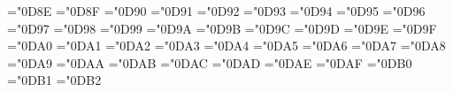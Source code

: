 \let\mNotLeftTriangleBar=\NotLeftTriangleBar 
\mathchardef\NotRightTriangleBar ="0D8E
\let\mNotRightTriangleBar=\NotRightTriangleBar 
\mathchardef\NotLeftTriangle ="0D8F
\let\mNotLeftTriangle=\NotLeftTriangle 
\mathchardef\NotLeftTriangleEqual ="0D90
\let\mNotLeftTriangleEqual=\NotLeftTriangleEqual 
\mathchardef\NotRightTriangle ="0D91
\let\mNotRightTriangle=\NotRightTriangle 
\mathchardef\NotRightTriangleEqual ="0D92
\let\mNotRightTriangleEqual=\NotRightTriangleEqual 
\mathchardef\neq ="0D93
\let\mNotEqual=\neq 
\mathchardef\nless ="0D94
\let\mNotLess=\nless 
\mathchardef\ngtr ="0D95
\let\mNotGreater=\ngtr 
\mathchardef\leq ="0D96
\let\mLessEqual=\leq 
\mathchardef\ll ="0D97
\let\mLessLess=\ll 
\mathchardef\gg ="0D98
\let\mGreaterGreater=\gg 
\mathchardef\nleq ="0D99
\let\mNotLessEqual=\nleq 
\mathchardef\geq ="0D9A
\let\mGreaterEqual=\geq 
\mathchardef\ngeq ="0D9B
\let\mNotGreaterEqual=\ngeq 
\mathchardef\LessSlantEqual ="0D9C
\let\mLessSlantEqual=\LessSlantEqual 
\mathchardef\LessFullEqual ="0D9D
\let\mLessFullEqual=\LessFullEqual 
\mathchardef\NotLessLess ="0D9E
\let\mNotLessLess=\NotLessLess 
\mathchardef\NotNestedLessLess ="0D9F
\let\mNotNestedLessLess=\NotNestedLessLess 
\mathchardef\NotLessSlantEqual ="0DA0
\let\mNotLessSlantEqual=\NotLessSlantEqual 
\mathchardef\NotLessFullEqual ="0DA1
\let\mNotLessFullEqual=\NotLessFullEqual 
\mathchardef\NestedLessLess ="0DA2
\let\mNestedLessLess=\NestedLessLess 
\mathchardef\NestedGreaterGreater ="0DA3
\let\mNestedGreaterGreater=\NestedGreaterGreater 
\mathchardef\GreaterSlantEqual ="0DA4
\let\mGreaterSlantEqual=\GreaterSlantEqual 
\mathchardef\GreaterFullEqual ="0DA5
\let\mGreaterFullEqual=\GreaterFullEqual 
\mathchardef\NotGreaterGreater ="0DA6
\let\mNotGreaterGreater=\NotGreaterGreater 
\mathchardef\NotNestedGreaterGreater ="0DA7
\let\mNotNestedGreaterGreater=\NotNestedGreaterGreater 
\mathchardef\NotGreaterSlantEqual ="0DA8
\let\mNotGreaterSlantEqual=\NotGreaterSlantEqual 
\mathchardef\NotGreaterFullEqual ="0DA9
\let\mNotGreaterFullEqual=\NotGreaterFullEqual 
\mathchardef\LessGreater ="0DAA
\let\mLessGreater=\LessGreater 
\mathchardef\GreaterLess ="0DAB
\let\mGreaterLess=\GreaterLess 
\mathchardef\NotLessGreater ="0DAC
\let\mNotLessGreater=\NotLessGreater 
\mathchardef\NotGreaterLess ="0DAD
\let\mNotGreaterLess=\NotGreaterLess 
\mathchardef\LessEqualGreater ="0DAE
\let\mLessEqualGreater=\LessEqualGreater 
\mathchardef\GreaterEqualLess ="0DAF
\let\mGreaterEqualLess=\GreaterEqualLess 
\mathchardef\subset ="0DB0
\let\mSubset=\subset 
\mathchardef\supset ="0DB1
\let\mSuperset=\supset 
\mathchardef\NotSubset ="0DB2
